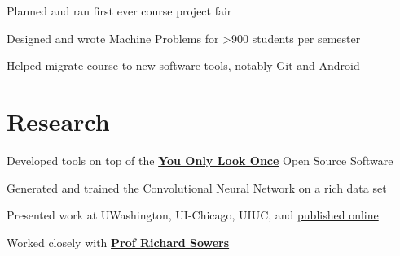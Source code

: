 \documentclass[]{deedy-resume-openfont}
\begin{document}
\begin{minipage}[t]{0.66\textwidth}
\begin{tightemize}
\item Planned and ran first ever course project fair
\item Designed and wrote Machine Problems for >900 students per semester
\item Helped migrate course to new software tools, notably Git and Android
\end{tightemize}
\sectionsep


\section{Research}
\begin{tightemize}
\item Developed tools on top of the \textbf{\href{https://pjreddie.com/darknet/yolo/}{You Only Look Once}} Open Source Software
\item Generated and trained the Convolutional Neural Network on a rich data set
\item Presented work at UWashington, UI-Chicago, UIUC, and \href{https://github.com/kylebegovich/URS}{published online}
\item Worked closely with \textbf{\href{http://publish.illinois.edu/r-sowers/}{Prof Richard Sowers}}
\end{tightemize}
\sectionsep






\end{minipage}
\end{document}
